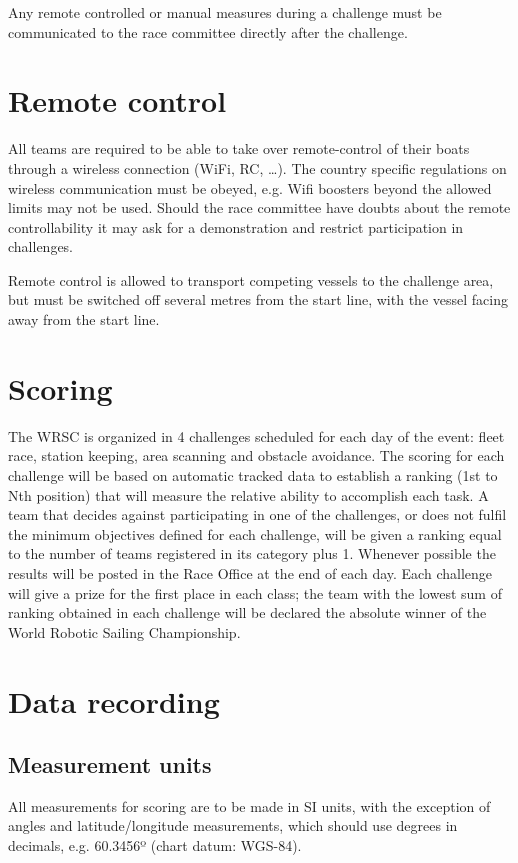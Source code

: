 \documentclass[12pt]{article}
\begin{document}
Any remote controlled or manual measures during a challenge must be
communicated to the race committee directly after the challenge.

\section{Remote control}
All teams are required to be able to take over remote-control of their boats
through a wireless connection (WiFi, RC, \ldots). The country specific 
regulations on wireless communication must be obeyed, e.g. Wifi boosters beyond
the allowed limits may not be used.
Should the race committee have doubts about the remote controllability it may
ask for a demonstration and restrict participation in challenges.

Remote control is allowed to transport competing vessels to the challenge area,
but must be switched off several metres from the start line, with the vessel
facing away from the start line.


\section{Scoring}
The WRSC is organized in 4 challenges scheduled for each day of the event: fleet
race, station keeping, area scanning and obstacle avoidance. The scoring for each 
challenge will be based on automatic tracked data to establish a ranking 
(1st to Nth position) that will measure the relative
ability to accomplish each task. A team that decides against participating in
one of the challenges, or does not fulfil the minimum objectives defined for
each challenge, will be given a ranking equal to the number of teams registered 
in its category plus 1. Whenever possible
the results will be posted in the Race Office at the end of each day.
Each challenge will give a prize for the first place in each class; the team
with the lowest sum of ranking obtained in each challenge will be declared the
absolute winner of the World Robotic Sailing Championship.

\section{Data recording}
\subsection{Measurement units}
All measurements for scoring are to be made in SI units, with the exception of
angles and latitude/longitude measurements, which should use degrees in
decimals, e.g. 60.3456º (chart datum: WGS-84).
\end{document}
